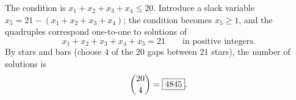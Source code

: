 The condition is $x_1+x_2+x_3+x_4\le20$. Introduce a slack variable $x_5=21-(x_1+x_2+x_3+x_4)$; the condition becomes $x_5\ge1$, and the quadruples correspond one-to-one to solutions of
\[
x_1+x_2+x_3+x_4+x_5=21\qquad\text{in positive integers.}
\]
By stars and bars (choose $4$ of the $20$ gaps between $21$ stars), the number of solutions is
\[
\dbinom{20}{4}=\boxed{4845}.
\]
